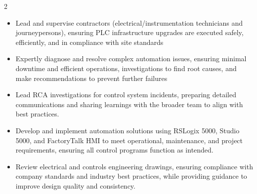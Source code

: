 \documentclass[10pt,a4paper,ragged2e,withhyper]{altacv}
\begin{document}
\begin{paracol}{2}


\begin{itemize}

\item Lead and supervise contractors (electrical/instrumentation technicians and journeypersons), ensuring PLC infrastructure upgrades are executed safely, efficiently, and in compliance with site standards
\item Expertly diagnose and resolve complex automation issues, ensuring minimal downtime and efficient operations, investigations to find root causes, and make recommendations to prevent further failures
\item Lead RCA investigations for control system incidents, preparing detailed communications and sharing learnings with the broader team to align with best practices.
\item Develop and implement automation solutions using RSLogix 5000, Studio 5000, and FactoryTalk HMI to meet operational, maintenance, and project requirements, ensuring all control programs function as intended.
\item Review electrical and controls engineering drawings, ensuring compliance with company standards and industry best practices, while providing guidance to improve design quality and consistency.

\end{itemize}


\end{paracol}
\end{document}
